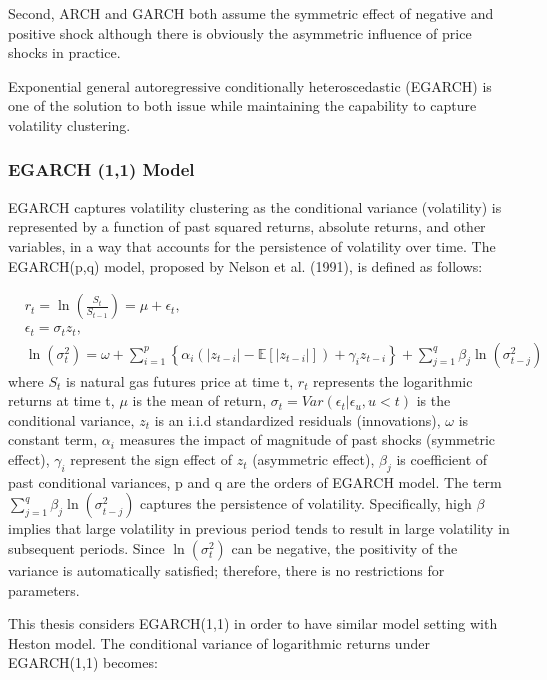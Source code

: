\documentclass[12pt,a4paper]{article}
\numberwithin{equation}{section}
\begin{document}
Second, ARCH and GARCH both assume the symmetric effect of negative and positive shock although there is obviously the asymmetric influence of price shocks in practice. 

Exponential general autoregressive conditionally heteroscedastic (EGARCH) is one of the solution to both issue while maintaining the capability to capture volatility clustering.


\subsubsection{EGARCH (1,1) Model}

EGARCH captures volatility clustering as the conditional variance (volatility) is represented by a function of past squared returns, absolute returns, and other variables, in a way that accounts for the persistence of volatility over time. The EGARCH(p,q) model, proposed by Nelson et al. (1991), is defined as follows:

 \begin{align*}
 &r_t = \ln \left(\frac{S_t}{S_{t-1}}\right) = \mu + \epsilon_t ,\\[0.6em]
 &\epsilon_t = \sigma_t z_t,\\[0.6em]
 &\ln\left(\sigma_t^2\right) = \omega + \sum_{i=1}^p \left\{ \alpha_i \left( |z_{t-i}| - \mathbb{E}[|z_{t-i}|] \right) + \gamma_i z_{t-i} \right\} + \sum_{j=1}^q \beta_j \ln\left(\sigma_{t-j}^2\right)
 \end{align*}
 where $S_t$ is natural gas futures price at time t,  $r_t$ represents the logarithmic returns at time t, $\mu$ is the mean of return, $\sigma_t = Var(\epsilon_t|\epsilon_u, u<t)$ is the conditional variance, $z_t$ is an i.i.d standardized residuals (innovations), $\omega$ is constant term, $\alpha_i$ measures the impact of magnitude of past shocks (symmetric effect), $\gamma_i$ represent the sign effect of $z_t$ (asymmetric effect), $\beta_j$ is coefficient of past conditional variances, p and q are the orders of EGARCH model. The term $\sum_{j=1}^q \beta_j \ln\left(\sigma_{t-j}^2\right)$ captures the persistence of volatility. Specifically, high $\beta$ implies that large volatility in previous period tends to result in large volatility in subsequent periods. Since $\ln(\sigma_t^2)$ can be negative, the positivity of the variance is automatically satisfied; therefore, there is no restrictions for parameters.
 
 This thesis considers EGARCH(1,1) in order to have similar model setting with Heston model. The conditional variance of logarithmic returns under EGARCH(1,1) becomes:
 
\end{document}
